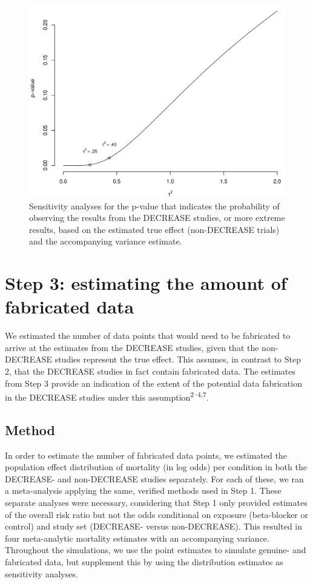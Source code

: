\documentclass[]{article}
\begin{document}
\begin{figure}

{\centering \includegraphics[width=0.8\linewidth]{../figures/fig2} 

}

\caption{Sensitivity analyses for the p-value that indicates the probability of observing the results from the DECREASE studies, or more extreme results, based on the estimated true effect (non-DECREASE trials) and the accompanying variance estimate.}\label{fig:figure 2}
\end{figure}

\section{Step 3: estimating the amount of fabricated
data}\label{step-3-estimating-the-amount-of-fabricated-data}

We estimated the number of data points that would need to be fabricated
to arrive at the estimates from the DECREASE studies, given that the
non-DECREASE studies represent the true effect. This assumes, in
contrast to Step 2, that the DECREASE studies in fact contain fabricated
data. The estimates from Step 3 provide an indication of the extent of
the potential data fabrication in the DECREASE studies under this
assumption\textsuperscript{2--4,7}.

\subsection{Method}\label{method-1}

In order to estimate the number of fabricated data points, we estimated
the population effect distribution of mortality (in log odds) per
condition in both the DECREASE- and non-DECREASE studies separately. For
each of these, we ran a meta-analysis applying the same, verified
methods used in Step 1. These separate analyses were necessary,
considering that Step 1 only provided estimates of the overall risk
ratio but not the odds conditional on exposure (beta-blocker or control)
and study set (DECREASE- versus non-DECREASE). This resulted in four
meta-analytic mortality estimates with an accompanying variance.
Throughout the simulations, we use the point estimates to simulate
genuine- and fabricated data, but supplement this by using the
distribution estimates as sensitivity analyses.
\end{document}
